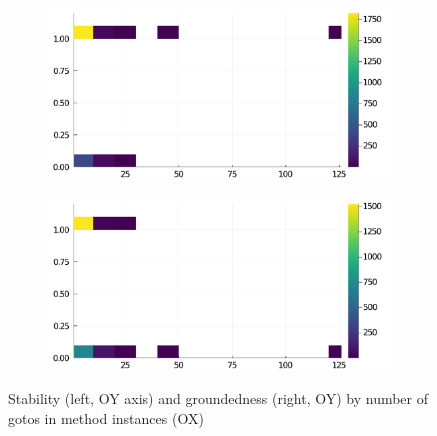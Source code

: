 \begin{figure}[h]
     \begin{subfigure}[b]{0.49\textwidth}
       \includegraphics[width=\textwidth]{figs/all-package-graphs/Pluto-gotos-vs-stable.pdf}
     \end{subfigure}
     \begin{subfigure}[b]{0.49\textwidth}
       \includegraphics[width=\textwidth]{figs/all-package-graphs/Pluto-gotos-vs-grounded.pdf}
     \end{subfigure}
\caption{Stability (left, OY axis) and groundedness (right, OY) by number of gotos in method instances (OX)}%
%
\label{figs:gotos:Pluto}
\end{figure}


